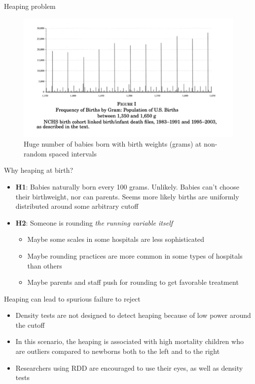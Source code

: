\documentclass{beamer}
\begin{document}
\begin{frame}{Heaping problem}


\begin{figure}[htb]
\centering	\includegraphics[scale=0.08]{./lecture_includes/heaping.jpg}%
\caption{Huge number of babies born with birth weights (grams) at non-random spaced intervals}
\end{figure}

\end{frame}



\begin{frame}{Why heaping at birth?}

\begin{itemize}
\item \textbf{H1}: Babies naturally born every 100 grams.  Unlikely. Babies can't choose their birthweight, nor can parents. Seems more likely births are uniformly distributed around some arbitrary cutoff
\item \textbf{H2}: Someone is rounding \emph{the running variable itself}
	\begin{itemize}
	\item Maybe some scales in some hospitals are less sophisticated
	\item Maybe rounding practices are more common in some types of hospitals than others
	\item Maybe parents and staff push for rounding to get favorable treatment
	\end{itemize}
\end{itemize}

\end{frame}

\begin{frame}{Heaping can lead to spurious failure to reject}

\begin{itemize}
\item Density tests are not designed to detect heaping because of low power around the cutoff 
\item In this scenario, the heaping is associated with high mortality children who are outliers compared to newborns both to the left and to the right
\item Researchers using RDD are encouraged to use their eyes, as well as density tests
\end{itemize}

\end{frame}
\end{document}
